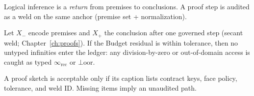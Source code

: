 Logical inference is a \emph{return} from premises to conclusions. A proof step is audited as a weld on the same anchor (premise set + normalization).

\begin{proposition}
Let \(X_-\) encode premises and \(X_+\) the conclusion after one governed step (secant weld; Chapter~\ref{ch:proofs}). If the Budget residual is within tolerance, then no untyped infinities enter the ledger: any division-by-zero or out-of-domain access is caught as typed \(\infty_{\mathrm{rec}}\) or \(\bot\!\mathrm{oor}\).
\end{proposition}

\begin{remark}
A proof sketch is acceptable only if its caption lists contract keys, face policy, tolerance, and weld ID. Missing items imply an unaudited path.
\end{remark}

